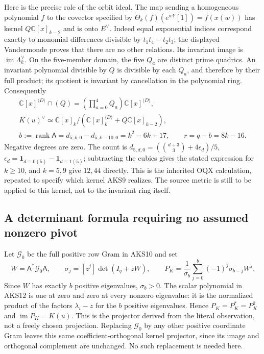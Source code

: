 \documentclass[11pt,a4paper]{article}
\begin{document}
Here is the precise role of the orbit ideal. The map sending a homogeneous
polynomial $f$ to the covector specified by
$\Theta_k(f)(e^{wY}[1])=f(x(w))$ has kernel
$Q\mathbb C[x]_{k-2}$ and is onto $E^\vee$. Indeed equal exponential
indices correspond exactly to monomial differences divisible by
$t_1t_4-t_2t_3$; the displayed Vandermonde proves that there are no other
relations. Its invariant image is $\operatorname{im}\Lambda_k^\vee$.
On the five-member domain, the five $Q_a$ are distinct prime quadrics.
An invariant polynomial divisible by $Q$ is divisible by each $Q_a$,
and therefore by their full product; its quotient is invariant by
cancellation in the polynomial ring. Consequently
\[
\begin{gathered}
 \mathbb C[x]^{\langle D\rangle}\cap (Q)
       =\left(\prod_{a=0}^4Q_a\right)\mathbb C[x]^{\langle D\rangle},\\
 K(u)^\vee\simeq
 \mathbb C[x]_k\big/(\mathbb C[x]_k^{\langle D\rangle}
                              +Q\mathbb C[x]_{k-2}),\\
 b:=\operatorname{rank}\mathsf A
     =d_{5,k,0}-d_{5,k-10,0}=k^2-6k+17,\qquad r=q-b=8k-16.
\end{gathered}\tag{AKS11}
\]
Negative degrees are zero. The count is
$d_{5,d,0}=(\binom{d+3}{3}+4\epsilon_d)/5$,
$\epsilon_d=\mathbf1_{d\equiv0(5)}-\mathbf1_{d\equiv1(5)}$;
subtracting the cubics gives the stated expression for $k\ge10$, and
$k=5,9$ give $12,44$ directly. This is the inherited OQX calculation,
repeated to specify which kernel AKS9 realizes. The source metric is
still to be applied to this kernel, not to the invariant ring itself.

\subsection{A determinant formula requiring no assumed nonzero pivot}
Let $\mathcal G_0$ be the full positive row Gram in AKS10 and set
\[
 W=\mathsf A^*\mathcal G_0\mathsf A,\qquad
 \sigma_j=[z^j]\det(I_q+zW),\qquad
 P_K=\frac1{\sigma_b}\sum_{j=0}^b(-1)^j\sigma_{b-j}W^j.
 \tag{AKS12}
\]
Since $W$ has exactly $b$ positive eigenvalues, $\sigma_b>0$. The scalar
polynomial in AKS12 is one at zero and zero at every nonzero eigenvalue:
it is the normalized product of the factors $\lambda_i-z$ for the $b$
positive eigenvalues. Hence $P_K=P_K^*=P_K^2$ and
$\operatorname{im}P_K=K(u)$. This is the projector derived from the
literal observation, not a freely chosen projection. Replacing
$\mathcal G_0$ by any other positive coordinate Gram leaves this same
coefficient-orthogonal kernel projector, since its image and orthogonal
complement are unchanged. No such replacement is needed here.
\end{document}
